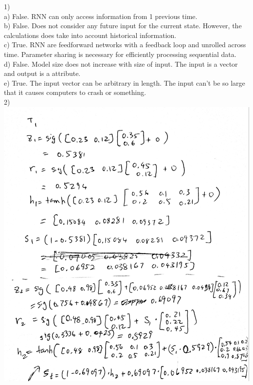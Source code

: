 \documentclass[11pt]{article}
\begin{document}
1) \\ 
a) False. RNN can only access information from 1 previous time. \\

b) False. Does not consider any future input for the current state. However, the calculations does take into account historical information. \\

c) True. RNN are feedforward networks with a feedback loop and unrolled across time. Parameter sharing is necessary for efficiently processing sequential data. \\

d) False. Model size does not increase with size of input. The input is a vector and output is a attribute. \\

e) True. The input vector can be arbitrary in length. The input can't be so large that it causes computers to crash or something. \\

2) \\ 
\includegraphics[scale=0.15]{p2}
\end{document}

